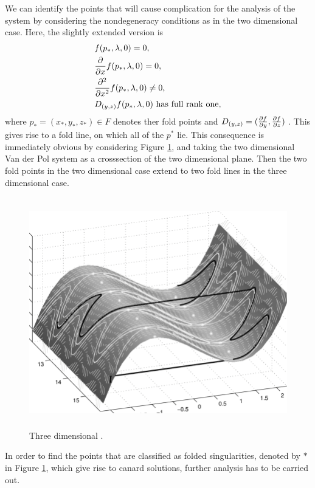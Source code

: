 We can identify the points that will cause complication for the analysis of the system by considering the nondegeneracy conditions as in the two dimensional case. Here, the slightly extended version is
\begin{equation}
\begin{aligned}
&f(p_*,\lambda,0)=0,\\
&\pd{}{x}f(p_*,\lambda,0)=0,\\
&\pd{^2}{x^2}f(p_*,\lambda,0)\neq 0,\\
&D_{(y,z)}f(p_*,\lambda,0) \ \text{has full rank one},
\end{aligned}
\label{eq: non-degeneracy 3d system}
\end{equation}
where $ p_*=(x_*,y_*,z_*)\in F $  denotes ther fold points and $ D_{(y,z)}=(\pd{f}{y},\pd{f}{z}) $  \citep{MMO}.
This gives rise to a fold line, on which all of the $p^*$ lie.
This consequence is immediately obvious by considering Figure \ref{fig: 3d folded singularity}, and taking the two dimensional Van der Pol system as a crosssection of the two dimensional plane. Then the two fold points in the two dimensional case extend to two fold lines in the three dimensional case.
\begin{figure}[h!]\centering
	\includegraphics[height=10cm,width=14cm]{Images/Three-dimensional-plot-of-a-trajectory-for-the-van-der-Pol-equation-and-the-critical}
	\caption{Three dimensional \vdp \citep{3D-VdP}.}
	\label{fig: 3d folded singularity}
\end{figure}\newpage
In order to find the points that are classified as folded singularities, denoted by $*$ in Figure \ref{fig: 3d folded singularity}, which give rise to canard solutions, further analysis has to be carried out.
